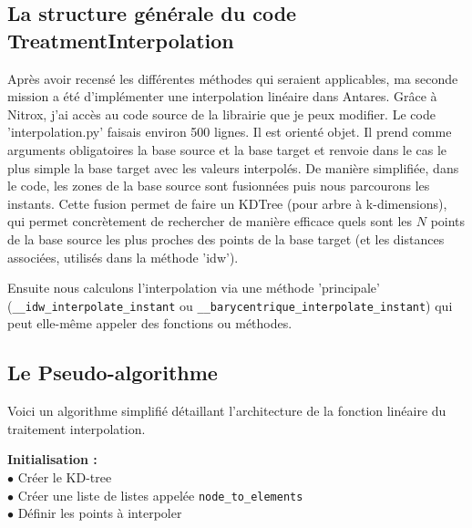\subsection{La structure générale du code TreatmentInterpolation}
Après avoir recensé les différentes méthodes qui seraient applicables, ma seconde mission a été d'implémenter une interpolation linéaire dans Antares. Grâce à Nitrox, j'ai accès au code source de la librairie que je peux modifier. Le code 'interpolation.py' faisais environ 500 lignes. Il est orienté objet. Il prend comme arguments obligatoires la base source et la base target et renvoie dans le cas le plus simple la base target avec les valeurs interpolés.
De manière simplifiée, dans le code, les zones de la base source sont fusionnées puis nous parcourons les instants. 
Cette fusion permet de faire un KDTree (pour arbre à k-dimensions), qui permet concrètement de rechercher de manière efficace quels sont les \( N \) points de la base source les plus proches des points de la base target (et les distances associées, utilisés dans la méthode 'idw').

Ensuite nous calculons l'interpolation via une méthode 'principale' (\lstinline{__idw_interpolate_instant} ou
\lstinline{__barycentrique_interpolate_instant}) qui peut elle-même appeler des fonctions ou méthodes.

\subsection{Le Pseudo-algorithme}

Voici un algorithme simplifié détaillant l'architecture de la fonction linéaire du traitement interpolation.

\vspace{0.5cm}

\textbf{Initialisation :}\\
$\bullet$ Créer le KD-tree\\
$\bullet$ Créer une liste de listes appelée \texttt{node\_to\_elements}\\
$\bullet$ Définir les points à interpoler\\

